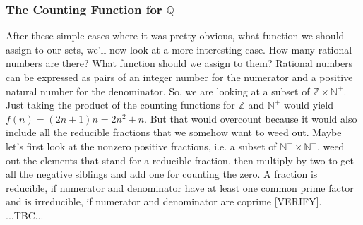 \documentclass[12pt]{article}
\begin{document}
\subsubsection{The Counting Function for $\mathbb{Q}$}
After these simple cases where it was pretty obvious, what function we should assign to our sets, we'll now look at a more interesting case. How many rational numbers are there? What function should we assign to them? Rational numbers can be expressed as pairs of an integer number for the numerator and a positive natural number for the denominator. So, we are looking at a subset of $\mathbb{Z} \times \mathbb{N}^+$. Just taking the product of the counting functions for $\mathbb{Z}$ and $\mathbb{N}^+$ would yield $f(n) = (2 n + 1) n = 2 n^2 + n$. But that would overcount because it would also include all the reducible fractions that we somehow want to weed out. Maybe let's first look at the nonzero positive fractions, i.e. a subset of $\mathbb{N}^+ \times \mathbb{N}^+$, weed out the elements that stand for a reducible fraction, then multiply by two to get all the negative siblings and add one for counting the zero. A fraction is reducible, if numerator and denominator have at least one common prime factor and is irreducible, if numerator and denominator are coprime [VERIFY]. ...TBC...




\end{document}
